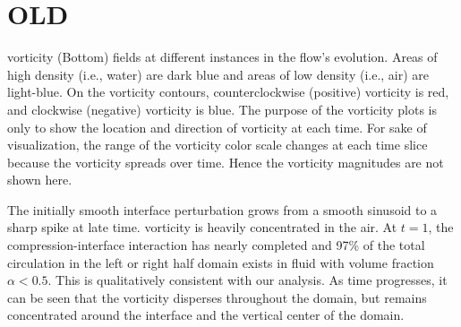 \section{OLD}

 vorticity (Bottom) fields at different instances in
the flow's evolution. Areas of high density (i.e., water) are dark
blue and areas of low density (i.e., air) are light-blue. On the
vorticity contours, counterclockwise (positive) vorticity is red, and
clockwise (negative) vorticity is blue. The purpose of the vorticity
plots is only to show the location and direction of vorticity at each
time. For sake of visualization, the range of the vorticity color
scale changes at each time slice because the vorticity spreads over
time. Hence the vorticity magnitudes are not shown here.  

The initially smooth interface perturbation grows from a smooth
sinusoid to a sharp spike at late time.  vorticity is heavily
concentrated in the air. At $t=1$, the compression-interface
interaction has nearly completed and 97\% of the total circulation in
the left or right half domain exists in fluid with volume fraction
$\alpha<0.5$. This is qualitatively consistent with our analysis. As
time progresses, it can be seen that the vorticity disperses
throughout the domain, but remains concentrated around the interface
and the vertical center of the domain.

